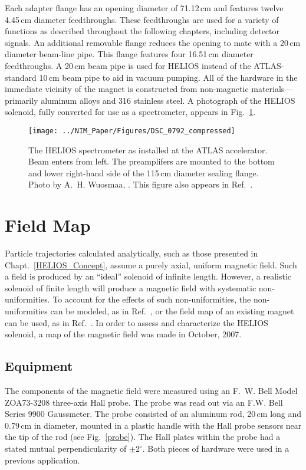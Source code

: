 Each adapter flange has an opening diameter of 71.12\,cm and features twelve 4.45\,cm diameter feedthroughs.  These feedthroughs are used for a variety of functions as described throughout the following chapters, including detector signals.  An additional removable flange reduces the opening to mate with a 20\,cm diameter beam-line pipe.  This flange features four 16.51\,cm diameter feedthroughs.  A 20\,cm beam pipe is used for HELIOS instead of the ATLAS-standard 10\,cm beam pipe to aid in vacuum pumping.  All of the hardware in the immediate vicinity of the magnet is constructed from non-\-magnetic materials---primarily aluminum alloys and 316 stainless steel.  A photograph of the HELIOS solenoid, fully converted for use as a spectrometer, appears in Fig.~\ref{solenoid}.

\begin{figure}
\centering
\texttt{[image: ../NIM\_Paper/Figures/DSC\_0792\_compressed]}
\caption[The HELIOS spectrometer as installed at the ATLAS accelerator]{The HELIOS spectrometer as installed at the ATLAS accelerator.  Beam enters from left.  The preamplifers are mounted to the bottom and lower right-hand side of the 115\,cm diameter sealing flange.  Photo by A.~H. Wuosmaa, \photodate{}.  This figure also appears in Ref.~\cite{Lighthall_2010}.}
\label{solenoid}
\end{figure}

\section{Field Map}
Particle trajectories calculated analytically, such as those presented in Chapt.~\ref{HELIOS_Concept}, assume a purely axial, uniform magnetic field.  Such a field is produced by an ``ideal'' solenoid of infinite length.  However, a realistic solenoid of finite length will produce a magnetic field with systematic non-\-uni\-for\-mi\-ties.  To account for the effects of such non-uniformities, the non-uniformities can be modeled, as in Ref.~\cite{Wuosmaa_2003}, or the field map of an existing magnet can be used, as in Ref.~\cite{Wuosmaa_2007}.  In order to assess and characterize the HELIOS solenoid, a map of the magnetic field was made in October, 2007.
\subsection{Equipment}
The components of the magnetic field were measured using an F.~W. Bell Model ZOA73-3208 three-axis Hall probe.  The probe was read out via an F.W. Bell Series 9900 Gaussmeter.  The probe consisted of an aluminum rod, 20\,cm long and 0.79\,cm in diameter, mounted in a plastic handle with the Hall probe sensors near the tip of the rod (see Fig.~\ref{probe}).  The Hall plates within the probe had a stated mutual perpendicularity of $\pm 2^\circ$. Both pieces of hardware were used in a previous application.  

